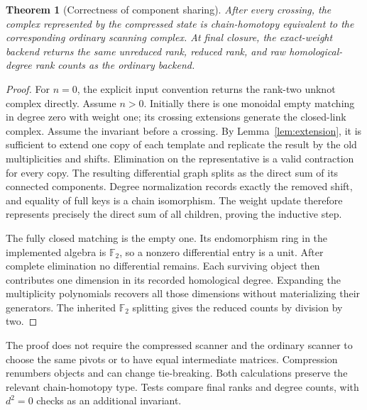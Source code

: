 \documentclass[11pt,letterpaper]{article}
\newtheorem{theorem}{Theorem}[section]
\newcommand{\F}{\mathbb F_2}
\begin{document}
\begin{theorem}[Correctness of component sharing]\label{thm:sharing}
After every crossing, the complex represented by the compressed state is
chain-homotopy equivalent to the corresponding ordinary scanning complex.
At final closure, the exact-weight backend returns the same unreduced rank,
reduced rank, and raw homological-degree rank counts as the ordinary backend.
\end{theorem}
\begin{proof}
For $n=0$, the explicit input convention returns the rank-two unknot
complex directly. Assume $n>0$. Initially there is one monoidal empty
matching in degree zero with weight one; its crossing extensions generate
the closed-link complex.
Assume the invariant before a crossing. By Lemma~\ref{lem:extension}, it is
sufficient to extend one copy of each template and replicate the result by
the old multiplicities and shifts. Elimination on the representative is a
valid contraction for every copy. The resulting differential graph splits
as the direct sum of its connected components. Degree normalization records
exactly the removed shift, and equality of full keys is a chain isomorphism.
The weight update therefore represents precisely the direct sum of all
children, proving the inductive step.

The fully closed matching is the empty one. Its endomorphism ring in the
implemented algebra is $\F$, so a nonzero differential entry is a unit.
After complete elimination no differential remains. Each surviving object
then contributes one dimension in its recorded homological degree. Expanding
the multiplicity polynomials recovers all those dimensions without
materializing their generators. The inherited $\F$ splitting gives the
reduced counts by division by two.
\end{proof}

The proof does not require the compressed scanner and the ordinary scanner
to choose the same pivots or to have equal intermediate matrices. Compression
renumbers objects and can change tie-breaking. Both calculations preserve
the relevant chain-homotopy type. Tests compare final ranks and degree counts,
with $d^2=0$ checks as an additional invariant.
\end{document}
